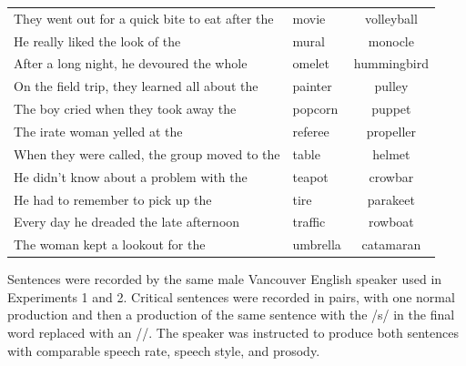 \begin{table}[!ht]
\begin{tabular}{llc}
They went out for a quick bite to eat after the   & movie      & volleyball  \\
He really liked the look of the                   & mural      & monocle     \\
After a long night, he devoured the whole         & omelet     & hummingbird \\
On the field trip, they learned all about the     & painter    & pulley      \\
The boy cried when they took away the             & popcorn    & puppet      \\
The irate woman yelled at the                     & referee    & propeller   \\
When they were called, the group moved to the     & table      & helmet      \\
He didn't know about a problem with the           & teapot     & crowbar     \\
He had to remember to pick up the                 & tire       & parakeet    \\
Every day he dreaded the late afternoon           & traffic    & rowboat     \\
The woman kept a lookout for the                  & umbrella   & catamaran  \\
\bottomrule
\end{tabular}
\end{table}

Sentences were recorded by the same male Vancouver English speaker used in Experiments 1 and 2.  
Critical sentences were recorded in pairs, with one normal production and then a production of the same sentence with the /s/ in the final word replaced with an /\textesh/.  
The speaker was instructed to produce both sentences with comparable speech rate, speech style, and prosody.

